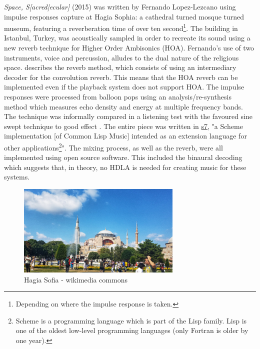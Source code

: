 \textit{Space, S[acred|ecular]} (2015) was written by Fernando Lopez-Lezcano using impulse responses capture at Hagia Sophia: a cathedral turned mosque turned museum, featuring a reverberation time of over ten second\footnote{Depending on where the impulse response is taken.}. The building in Istanbul, Turkey, was acoustically sampled in order to recreate its sound using a new reverb technique for Higher Order Ambisonics (HOA). Fernando's use of two instruments, voice and percussion, alludes to the dual nature of the religious space.  \cite{lopez2014architecture} describes the reverb method, which consists of using an intermediary decoder for the convolution reverb. This means that the HOA reverb can be implemented even if the playback system does not support HOA. The impulse responses were processed from balloon pops using an analysis/re-synthesis method which measures echo density and energy at multiple frequency bands. The technique was informally compared in a listening test with the favoured sine swept technique to good effect \cite{abel2010estimating}. The entire piece was written in \href{https://ccrma.stanford.edu/software/snd/snd/s7.html#juce}{s7}, "a Scheme implementation [of Common Lisp Music] intended as an extension language for other applications\footnote{Scheme is a programming language which is part of the Lisp family. Lisp is one of the oldest low-level programming languages (only Fortran is older by one year).}". The mixing process, as well as the reverb, were all implemented using open source software. This included the binaural decoding which suggests that, in theory, no HDLA is needed for creating music for these systems. 

\begin{figure}[ht!]%
\centering
\includegraphics[width=0.7\textwidth]{img/hagia-sofia.jpg} 
\caption{Hagia Sofia - wikimedia commons}
\end{figure}


